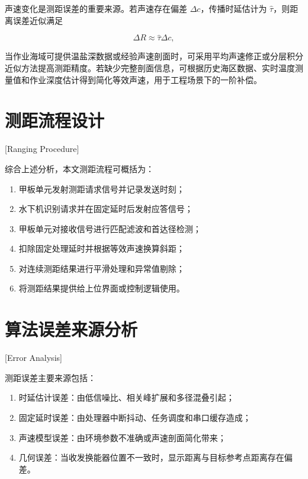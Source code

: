 声速变化是测距误差的重要来源。若声速存在偏差 $\Delta c$，传播时延估计为 $\hat{\tau}$，则距离误差近似满足

\begin{equation}
  \Delta R \approx \hat{\tau} \Delta c,
  \label{eq:sound_speed_error}
\end{equation}

当作业海域可提供温盐深数据或经验声速剖面时，可采用平均声速修正或分层积分近似方法提高测距精度\cite{ChenHongXiaLuLianGangHuaFengFanBinLiuNuoFangJunWeiSanZhongChangYongShengSuSuanFaDeBiJiao2005,ZhaoDiNengShengSuPouMianJingJianYunSuanDeGaiJinDPSuanFaJiQiPingGu2014}。若缺少完整剖面信息，可根据历史海区数据、实时温度测量值和作业深度估计得到简化等效声速，用于工程场景下的一阶补偿。

\section{测距流程设计}[Ranging Procedure]

综合上述分析，本文测距流程可概括为：

\begin{enumerate}
  \item 甲板单元发射测距请求信号并记录发送时刻；
  \item 水下机识别请求并在固定延时后发射应答信号；
  \item 甲板单元对接收信号进行匹配滤波和首达径检测；
  \item 扣除固定处理延时并根据等效声速换算斜距；
  \item 对连续测距结果进行平滑处理和异常值剔除；
  \item 将测距结果提供给上位界面或控制逻辑使用。
\end{enumerate}

\section{算法误差来源分析}[Error Analysis]

测距误差主要来源包括：

\begin{enumerate}
  \item 时延估计误差：由低信噪比、相关峰扩展和多径混叠引起；
  \item 固定延时误差：由处理器中断抖动、任务调度和串口缓存造成；
  \item 声速模型误差：由环境参数不准确或声速剖面简化带来；
  \item 几何误差：当收发换能器位置不一致时，显示距离与目标参考点距离存在偏差。
\end{enumerate}

